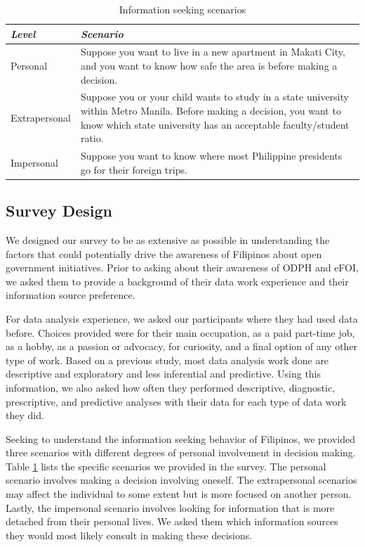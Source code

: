 \documentclass{sigchi}
\begin{document}
\begin{table}[t]
    \centering
    \begin{tabular}{l p{5.85cm}}
         \toprule
         \textbf{\textit{Level}} & \textbf{\textit{Scenario}}  \\
         \midrule
         Personal &  Suppose you want to live in a new apartment in Makati City, and you want to know how safe the area is before making a decision.\\
         \midrule
         Extrapersonal & Suppose you or your child wants to study in a state university within Metro Manila. Before making a decision, you want to know which state university has an acceptable faculty/student ratio.\\
         \midrule
         Impersonal & Suppose you want to know where most Philippine presidents go for their foreign trips.\\
         \bottomrule
    \end{tabular}
    \caption{Information seeking scenarios}
    \label{tab:scenarios}
\end{table}

\subsection{Survey Design}
We designed our survey to be as extensive as possible in understanding the factors that could potentially drive the awareness of Filipinos about open government initiatives. Prior to asking about their awareness of ODPH and eFOI, we asked them to provide a background of their data work experience and their information source preference. 

For data analysis experience, we asked our participants where they had used data before. Choices provided were for their main occupation, as a paid part-time job, as a hobby, as a passion or advocacy, for curiosity, and a final option of any other type of work. Based on a previous study, most data analysis work done are descriptive and exploratory and less inferential and predictive\cite{choi2017characteristics}. Using this information, we also asked how often they performed descriptive, diagnostic,  prescriptive, and predictive analyses with their data for each type of data work they did.

Seeking to understand the information seeking behavior of Filipinos, we provided three scenarios with different degrees of personal involvement in decision making. Table \ref{tab:scenarios} lists the specific scenarios we provided in the survey. The personal scenario involves making a decision involving oneself. The extrapersonal scenarios may affect the individual to some extent but is more focused on another person. Lastly, the impersonal scenario involves looking for information that is more detached from their personal lives. We asked them which information sources they would most likely consult in making these decisions.
\end{document}
